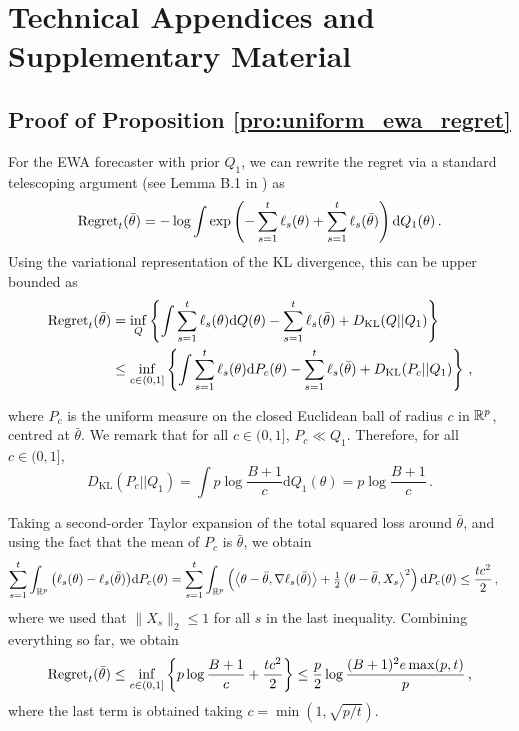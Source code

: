 

\section{Technical Appendices and Supplementary Material}

\subsection[Proof of Proposition 2]{Proof of Proposition \ref{pro:uniform_ewa_regret}}\label{app:prop2}
For the EWA forecaster with prior $Q_1$, we can rewrite the regret via a standard telescoping argument (see Lemma B.1 in \citealp{clerico2025confidence}) as 
$$\mathrm{Regret}_t(\bar{\theta}) = -\log\int\exp\left(-\sum_{s=1}^{t}\ell_s(\theta) + \sum_{s=1}^{t}\ell_s(\bar{\theta})\right)\mathrm{d}Q_1(\theta)\,.$$
Using the variational representation of the KL divergence, this can be upper bounded as
\begin{align*}
\mathrm{Regret}_t(\bar{\theta}) &= \inf_{Q}\left\{\int\sum_{s=1}^{t}\ell_s(\theta)\mathrm{d}Q(\theta) - \sum_{s=1}^{t}\ell_s(\bar{\theta}) + D_{\mathrm{KL}}(Q||Q_1)\right\}\\
&\leq \inf_{c \in (0, 1]}\left\{\int\sum_{s=1}^{t}\ell_s(\theta)\mathrm{d}P_c(\theta) - \sum_{s=1}^{t}\ell_s(\bar{\theta}) + D_{\mathrm{KL}}(P_c||Q_1)\right\}\,,
\end{align*}

where $P_c$ is the uniform measure on the closed Euclidean ball of radius $c$ in $\mathbb{R}^p$, centred at $\bar\theta$. We remark that for all $c \in (0, 1]$, $P_c\ll Q_1$. Therefore, for all $c \in (0, 1]$,
\begin{equation*}
D_{\mathrm{KL}}(P_c||Q_1) = \int p\log\frac{B+1}{c}\mathrm{d}Q_1(\theta) = p\log\frac{B+1}{c}\,.
\end{equation*}

Taking a second-order Taylor expansion of the total squared loss around $\bar{\theta}$, and using the fact that the mean of $P_c$ is $\bar{\theta}$, we obtain
\begin{align*}
\sum_{s=1}^{t}\int_{\mathbb{R}^p}\big(\ell_s(\theta)-\ell_s(\bar{\theta})\big)\mathrm{d}P_c(\theta) &= \sum_{s=1}^t\int_{\mathbb{R}^p}\left(\left\langle\theta - \bar{\theta},\nabla\ell_s(\bar{\theta})\right\rangle + \tfrac{1}{2}\left\langle\theta - \bar{\theta},X_s\right\rangle^2\right)\mathrm{d}P_c(\theta) \leq \frac{tc^2}{2}\,,
\end{align*}
where we used that $\|X_s\|_2\leq 1$ for all $s$ in the last inequality. Combining everything so far, we obtain
\begin{equation*}
\mathrm{Regret}_t(\bar{\theta}) \leq \inf_{c \in (0, 1]}\left\{p\log\frac{B+1}{c} + \frac{tc^2}{2}\right\} \leq \frac{p}{2}\log\frac{(B+1)^2e\max(p, t)}{p}\,,
\end{equation*}
where the last term is obtained taking $c = \min(1, \sqrt{p/t})$.

